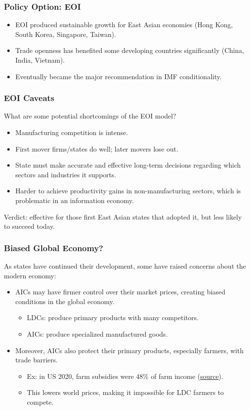 \documentclass{beamer}
\begin{document}
\begin{frame} 
	\frametitle{\LARGE{Policy Option: EOI}} 
		\begin{itemize}
			\item EOI produced sustainable growth for East Asian economies (Hong Kong, South Korea, Singapore, Taiwan). \pause
			\item Trade openness has benefited some developing countries significantly (China, India, Vietnam). \pause 
			\item Eventually became the major recommendation in IMF conditionality. 
		\end{itemize}

\end{frame}

\begin{frame} 
	\frametitle{\LARGE{EOI Caveats}} 
What are some potential shortcomings of the EOI model?
	\begin{itemize}
		\item Manufacturing competition is intense. \pause 
		\item First mover firms/states do well; later movers lose out. \pause 
		\item State must make accurate and effective long-term decisions regarding which sectors and industries it supports. \pause
		\item Harder to achieve productivity gains in non-manufacturing sectors, which is problematic in an information economy. \pause 
	\end{itemize}
Verdict: effective for those first East Asian states that adopted it, but less likely to succeed today.
\end{frame}

\begin{frame} 
	\frametitle{\LARGE{Biased Global Economy?}}
	As states have continued their development, some have raised concerns about the modern economy:
	\begin{itemize}
			\item AICs may have firmer control over their market prices, creating biased conditions in the global economy. \pause 
			\begin{itemize}
			    \item LDCs: produce primary products with many competitors. \pause 
			    \item AICs: produce specialized manufactured goods. \pause 
			\end{itemize}
			\item Moreover, AICs also protect their primary products, especially farmers, with trade barriers. \pause
			\begin{itemize}
			    \item Ex: in US 2020, farm subsidies were 48\% of farm income (\href{https://www.fb.org/market-intel/2022-farm-profitability-outlook-production-expenses-up-net-farm-income-down}{source}). \pause 
			    \item This lowers world prices, making it impossible for LDC farmers to compete.  
			\end{itemize}
	\end{itemize}
\end{frame}
\end{document}
